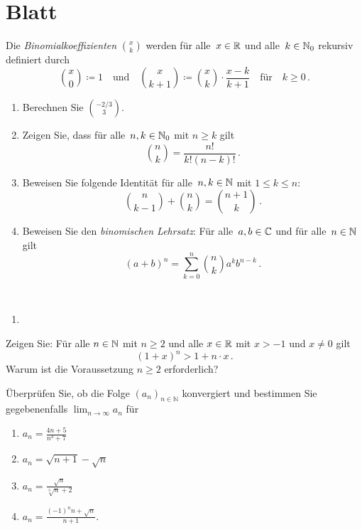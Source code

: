 \section{Blatt}

\begin{aufg}[8 Punkte] 
Die \textit{Binomialkoeffizienten} ${x\choose k}$ werden f\"ur alle~$x\in \mathbb{R}$ und alle~$ k\in \mathbb{N}_0$ rekursiv definiert durch 
\[
{ x\choose 0 } \coloneqq 1 \quad\text{und} \quad {x\choose k+1} \coloneqq {x\choose k }\cdot\frac{x-k}{k+1} \quad\text{f\"ur} \quad k\geq 0\,.
\]
\begin{enumerate}[label=$\mathrm{(\roman*)}$, ref=$\mathrm{\roman*}$]
\item Berechnen Sie ${-2/3 \choose 3}$.
\item Zeigen Sie, dass f\"ur alle~$n, k\in \mathbb{N}_0$ mit $n\geq k$ gilt
\[
{ n \choose k } = \frac{n!}{k!(n-k)!}\,. 
\]
\item Beweisen Sie folgende Identit\"at f\"ur alle~$n, k\in \mathbb{N}$ mit $1\leq k\leq n$:
\[
{ n \choose k-1 } + { n \choose k } = { n+1 \choose k }\,.
\]
\item Beweisen Sie den \textit{binomischen Lehrsatz}: F\"ur alle~$a,b\in \mathbb{C}$ und f\"ur alle~$n\in \mathbb{N}$ gilt
\[
(a+b)^{n} = \sum_{k=0}^{n} { n \choose k }a^{k}b^{n-k}\,.  
\]
\end{enumerate}
\end{aufg}


\bigskip

\begin{lsg}\mbox{ }
\begin{enumerate}[label=$\mathrm{(\roman*)}$, ref=$\mathrm{\roman*}$]
\item 
\end{enumerate}
\end{lsg}

\bigskip



\begin{aufg}[4 Punkte]
Zeigen Sie: Für alle $n\in \mathbb{N}$ mit $n\ge2$ und alle $x\in\mathbb{R}$ mit $x>-1$ und $x\neq0$ gilt 
\[
(1+x)^n> 1+n\cdot x\,.
\]
Warum ist die Voraussetzung $n\ge2$ erforderlich?
\end{aufg}
 

\bigskip

\begin{lsg}
\end{lsg}


\bigskip


\begin{aufg}[6 Punkte]
\"Uberpr\"ufen Sie, ob die Folge $ (a_{n})_{n\in \mathbb{N}} $ konvergiert und bestimmen Sie gegebenenfalls $\lim_{n\to\infty} a_{n} $ f\"ur 
\begin{enumerate}[label=$\mathrm{(\roman*)}$, ref=$\mathrm{\roman*}$]
\setlength{\itemsep}{2pt}
\item $a_{n} = \frac{4n + 5}{n^{3}+7}$
\item $a_{n} = \sqrt{n+1} - \sqrt{n}$
\item $a_{n} = \frac{\sqrt{n}}{\sqrt[3]{n}+2}$
\item $a_{n} = \frac{(-1)^{n}n + \sqrt{n}}{n+1}$.
\end{enumerate}
\end{aufg}


